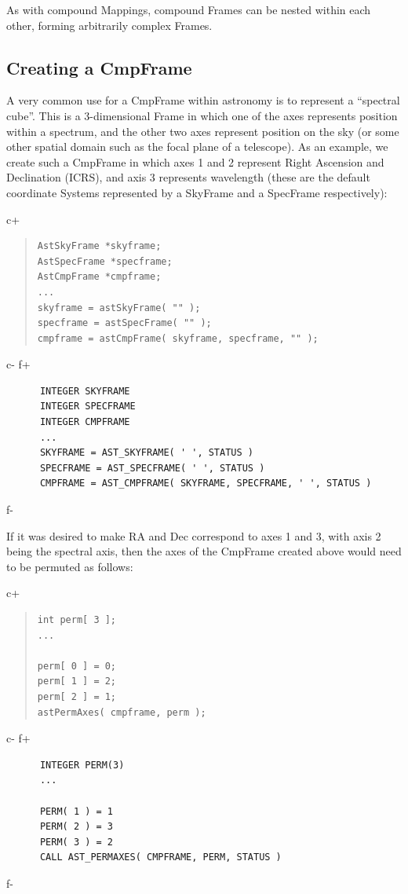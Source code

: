 \documentclass[twoside,11pt]{article}
\begin{document}
As with compound Mappings, compound Frames can be nested within each
other, forming arbitrarily complex Frames.

\subsection{Creating a CmpFrame}
A very common use for a CmpFrame within astronomy is to represent a
``spectral cube''. This is a 3-dimensional Frame in which one of the axes
represents position within a spectrum, and the other two axes represent
position on the sky (or some other spatial domain such as the focal plane
of a telescope). As an example, we create such a CmpFrame in which axes
1 and 2 represent Right Ascension and Declination (ICRS), and axis 3 
represents wavelength (these are the default coordinate Systems
represented by a SkyFrame and a SpecFrame respectively):

c+
\begin{quote}
\small
\begin{verbatim}
AstSkyFrame *skyframe;
AstSpecFrame *specframe;
AstCmpFrame *cmpframe;
...
skyframe = astSkyFrame( "" );
specframe = astSpecFrame( "" );
cmpframe = astCmpFrame( skyframe, specframe, "" );
\end{verbatim}
\normalsize
\end{quote}
c-
f+
\small
\begin{verbatim}
      INTEGER SKYFRAME
      INTEGER SPECFRAME
      INTEGER CMPFRAME
      ...
      SKYFRAME = AST_SKYFRAME( ' ', STATUS )
      SPECFRAME = AST_SPECFRAME( ' ', STATUS )
      CMPFRAME = AST_CMPFRAME( SKYFRAME, SPECFRAME, ' ', STATUS )
\end{verbatim}
\normalsize
f-

If it was desired to make RA and Dec correspond to axes 1 and 3, with
axis 2 being the spectral axis, then the axes of the CmpFrame created 
above would need to be permuted as follows:

c+
\begin{quote}
\small
\begin{verbatim}
int perm[ 3 ];
...

perm[ 0 ] = 0;
perm[ 1 ] = 2;
perm[ 2 ] = 1;
astPermAxes( cmpframe, perm ); 
\end{verbatim}
\normalsize
\end{quote}
c-
f+
\small
\begin{verbatim}
      INTEGER PERM(3)
      ...

      PERM( 1 ) = 1
      PERM( 2 ) = 3
      PERM( 3 ) = 2
      CALL AST_PERMAXES( CMPFRAME, PERM, STATUS ) 
\end{verbatim}
\normalsize
f-
\end{document}
